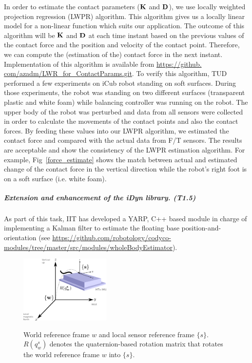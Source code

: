 In order to estimate the contact parameters ($\mathbf{K}$ and $\mathbf{D}$), we use locally
weighted projection regression (LWPR) algorithm.  This algorithm gives us a
locally linear model for a non-linear function which suits our application.
The outcome of this algorithm will be $\mathbf{K}$ and $\mathbf{D}$ at each time instant
based on the previous values of the contact force and the position and
velocity of the contact point.  Therefore, we can compute the (estimation of
the) contact force in the next instant.  Implementation of this algorithm is
available from \url{https://github. com/azadm/LWR_for_ContactParams.git}.  To
verify this algorithm, TUD performed a few experiments on iCub robot standing
on soft surfaces.  During those experiments, the robot was standing on two
different surfaces (transparent plastic and white foam) while balancing
controller was running on the robot.  The upper body of the robot was
perturbed and data from all sensors were collected in order to calculate the
movements of the contact points and also the contact forces.  By feeding these
values into our LWPR algorithm, we estimated the contact force and compared
with the actual data from F/T sensors.  The results are acceptable and show
the consistency of the LWPR estimation algorithm.  For example,
Fig~\ref{force_estimate} shows the match between actual and estimated change
of the contact force in the vertical direction while the robot's right foot is
on a soft surface (i.e. white foam).
%



\subparagraph{Extension and enhancement of the iDyn library. (T1.5)}
\label{sec:T15}

As part of this task, IIT has developed a YARP, C++ based  module in charge of implementing a Kalman filter to estimate the floating base position-and-orientation 
(see \url{https://github.com/robotology/codyco-modules/tree/master/src/modules/wholeBodyEstimator}). 
\begin{figure}[t!]
 \centering
 \includegraphics[width=0.4\textwidth]{images/MixCoordSys.png}
 \label{fig:coordsys}
 \caption{World reference frame $w$ and local sensor reference frame $\{s\}$. $R(q^{s}_{w})$ denotes the quaternion-based rotation matrix that rotates the world reference frame $w$ into $\{s\}$. }
\end{figure}

